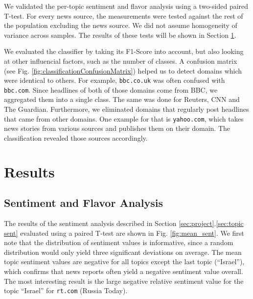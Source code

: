 \documentclass[final]{ieee}
\begin{document}
We validated the per-topic sentiment and flavor analysis using a two-sided paired T-test. For every news source, the measurements were tested against the rest of the population excluding the news source. We did not assume homogeneity of variance across samples. The results of these tests will be shown in Section \ref{sec:results}.

We evaluated the classifier by taking its F1-Score into account, but also looking at other influencial factors, such as the number of classes. A confusion matrix (see Fig. \ref{fig:classificationConfusionMatrix}) helped us to detect domains which were identical to others. For example, \texttt{bbc.co.uk} was often confused with \texttt{bbc.com}. Since headlines of both of those domains come from BBC, we aggregated them into a single class. The same was done for Reuters, CNN and The Guardian. Furthermore, we eliminated domains that regularly post headlines that came from other domains. One example for that is \texttt{yahoo.com}, which takes news stories from various sources and publishes them on their domain. The classification revealed those sources accordingly.

\section{Results}\label{sec:results}



\subsection{Sentiment and Flavor Analysis}

The results of the sentiment analysis described in Section \ref{sec:project}.\ref{sec:topic sent} evaluated using a paired T-test are shown in Fig. \ref{fig:mean_sent}. We first note that the distribution of sentiment values is informative, since a random distribution would only yield three significant deviations on average. The mean topic sentiment values are negative for all topics except the last topic (``Israel''), which confirms that news reports often yield a negative sentiment value overall. The most interesting result is the large negative relative sentiment value for the topic ``Israel'' for \texttt{rt.com} (Russia Today).
\end{document}
